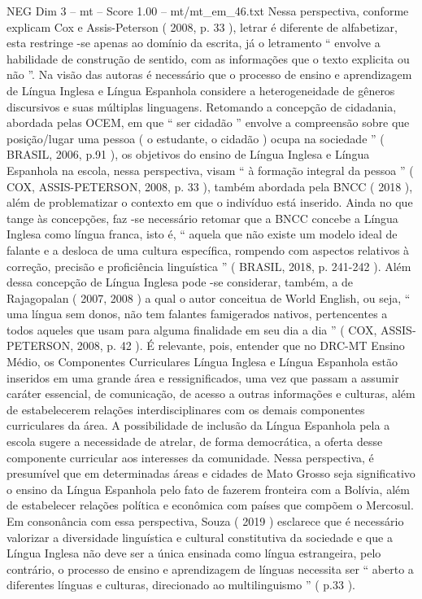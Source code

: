 \begin{textsample}{NEG Dim 3 – mt – Score 1.00 – mt/mt\_em\_46.txt}
Nessa perspectiva, conforme explicam Cox e Assis-Peterson ( 2008, p. 33 ), letrar é diferente de alfabetizar, esta restringe -se apenas ao domínio da escrita, já o letramento “ envolve a habilidade de construção de sentido, com as informações que o texto explicita ou não ”.
Na visão das autoras é necessário que o processo de ensino e aprendizagem de Língua Inglesa e Língua Espanhola considere a heterogeneidade de gêneros discursivos e suas múltiplas linguagens.
Retomando a concepção de cidadania, abordada pelas OCEM, em que “ ser cidadão ” envolve a compreensão sobre que posição/lugar uma pessoa ( o estudante, o cidadão ) ocupa na sociedade ” ( BRASIL, 2006, p.91 ), os objetivos do ensino de Língua Inglesa e Língua Espanhola na escola, nessa perspectiva, visam “ à formação integral da pessoa ” ( COX, ASSIS-PETERSON, 2008, p. 33 ), também abordada pela BNCC ( 2018 ), além de problematizar o contexto em que o indivíduo está inserido.
Ainda no que tange às concepções, faz -se necessário retomar que a BNCC concebe a Língua Inglesa como língua franca, isto é, “ aquela que não existe um modelo ideal de falante e a desloca de uma cultura específica, rompendo com aspectos relativos à correção, precisão e proficiência linguística ” ( BRASIL, 2018, p. 241-242 ).
Além dessa concepção de Língua Inglesa pode -se considerar, também, a de Rajagopalan ( 2007, 2008 ) a qual o autor conceitua de World English, ou seja, “ uma língua sem donos, não tem falantes famigerados nativos, pertencentes a todos aqueles que usam para alguma finalidade em seu dia a dia ” ( COX, ASSIS-PETERSON, 2008, p. 42 ).
É relevante, pois, entender que no DRC-MT Ensino Médio, os Componentes Curriculares Língua Inglesa e Língua Espanhola estão inseridos em uma grande área e ressignificados, uma vez que passam a assumir caráter essencial, de comunicação, de acesso a outras informações e culturas, além de estabelecerem relações interdisciplinares com os demais componentes curriculares da área.
A possibilidade de inclusão da Língua Espanhola pela a escola sugere a necessidade de atrelar, de forma democrática, a oferta desse componente curricular aos interesses da comunidade.
Nessa perspectiva, é presumível que em determinadas áreas e cidades de Mato Grosso seja significativo o ensino da Língua Espanhola pelo fato de fazerem fronteira com a Bolívia, além de estabelecer relações política e econômica com países que compõem o Mercosul.
Em consonância com essa perspectiva, Souza ( 2019 ) esclarece que é necessário valorizar a diversidade linguística e cultural constitutiva da sociedade e que a Língua Inglesa não deve ser a única ensinada como língua estrangeira, pelo contrário, o processo de ensino e aprendizagem de línguas necessita ser “ aberto a diferentes línguas e culturas, direcionado ao multilinguismo ” ( p.33 ).

\end{textsample}
